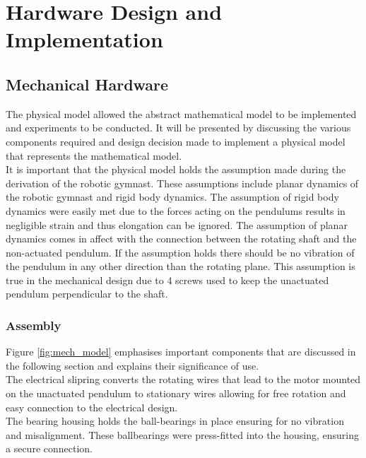 \chapter{Hardware Design and Implementation}


\section{Mechanical Hardware}
\label{sec:mechanical_hardware}
The physical model allowed the abstract mathematical model to be implemented and experiments to be conducted. It will be presented by discussing the various components required and design decision made to implement a physical model that represents the mathematical model.\\

It is important that the physical model holds the assumption made during the derivation of the robotic gymnast. These assumptions include planar dynamics of the robotic gymnast and rigid body dynamics. The assumption of rigid body dynamics were easily met due to the forces acting on the pendulums results in negligible strain and thus elongation can be ignored. The assumption of planar dynamics comes in affect with the connection between the rotating shaft and the non-actuated pendulum. If the assumption holds there should be no vibration of the pendulum in any other direction than the rotating plane. This assumption is true in the mechanical design due to 4 screws used to keep the unactuated pendulum perpendicular to the shaft. \\

\subsection{Assembly}
Figure \ref{fig:mech_model} emphasises important components that are discussed in the following section and explains their significance of use.\\

The electrical slipring converts the rotating wires that lead to the motor mounted on the unactuated pendulum to stationary wires allowing for free rotation and easy connection to the electrical design.\\

The bearing housing holds the ball-bearings in place ensuring for no vibration and misalignment. These ballbearings were press-fitted into the housing, ensuring a secure connection.\\

